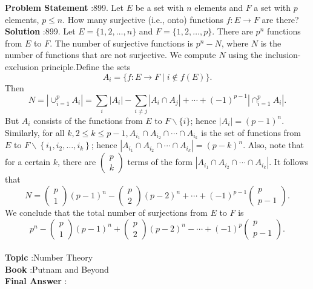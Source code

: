 \documentclass[10pt]{article}
\begin{document}
\textbf{Problem Statement} :899. Let $E$ be a set with $n$ elements and $F$ a set with $p$ elements, $p \leq n$. How many surjective (i.e., onto) functions $f: E \rightarrow F$ are there?\\
\textbf{Solution} :899. Let $E=\{1,2, \ldots, n\}$ and $F=\{1,2, \ldots, p\}$. There are $p^{n}$ functions from $E$ to $F$. The number of surjective functions is $p^{n}-N$, where $N$ is the number of functions that are not surjective. We compute $N$ using the inclusion-exclusion principle.Define the sets$$ A_{i}=\{f: E \rightarrow F \mid i \notin f(E)\} . $$Then$$ N=\left|\cup_{i=1}^{p} A_{i}\right|=\sum_{i}\left|A_{i}\right|-\sum_{i \neq j}\left|A_{i} \cap A_{j}\right|+\cdots+(-1)^{p-1}\left|\cap_{i=1}^{p} A_{i}\right| . $$But $A_{i}$ consists of the functions from $E$ to $F \backslash\{i\}$; hence $\left|A_{i}\right|=(p-1)^{n}$. Similarly, for all $k, 2 \leq k \leq p-1, A_{i_{1}} \cap A_{i_{2}} \cap \cdots \cap A_{i_{k}}$ is the set of functions from $E$ to $F \backslash\left\{i_{1}, i_{2}, \ldots, i_{k}\right\}$; hence $\left|A_{i_{1}} \cap A_{i_{2}} \cap \cdots \cap A_{i_{k}}\right|=(p-k)^{n}$. Also, note that for a certain $k$, there are $\left(\begin{array}{l}p \\ k\end{array}\right)$ terms of the form $\left|A_{i_{1}} \cap A_{i_{2}} \cap \cdots \cap A_{i_{k}}\right|$. It follows that$$ N=\left(\begin{array}{l} p \\ 1 \end{array}\right)(p-1)^{n}-\left(\begin{array}{l} p \\ 2 \end{array}\right)(p-2)^{n}+\cdots+(-1)^{p-1}\left(\begin{array}{c} p \\ p-1 \end{array}\right) . $$We conclude that the total number of surjections from $E$ to $F$ is$$ p^{n}-\left(\begin{array}{l} p \\ 1 \end{array}\right)(p-1)^{n}+\left(\begin{array}{l} p \\ 2 \end{array}\right)(p-2)^{n}-\cdots+(-1)^{p}\left(\begin{array}{c} p \\ p-1 \end{array}\right) . $$\\
\textbf{Topic} :Number Theory\\
\textbf{Book} :Putnam and Beyond\\
\textbf{Final Answer} :\\
\end{document}
